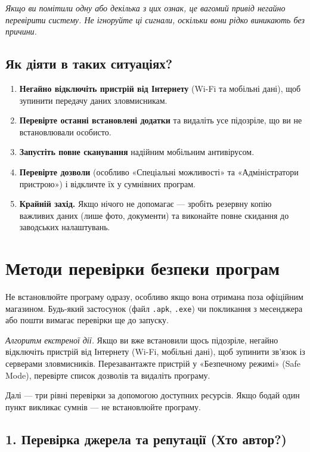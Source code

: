 \textit{Якщо ви помітили одну або декілька з цих ознак, це вагомий привід негайно перевірити систему. Не ігноруйте ці сигнали, оскільки вони рідко виникають без причини.}

\subsection*{Як діяти в таких ситуаціях?}

\begin{enumerate}
    \item \textbf{Негайно відключіть пристрій від Інтернету} (Wi-Fi та мобільні дані), щоб зупинити передачу даних зловмисникам.
    \item \textbf{Перевірте останні встановлені додатки} та видаліть усе підозріле, що ви не встановлювали особисто.
    \item \textbf{Запустіть повне сканування} надійним мобільним антивірусом.
    \item \textbf{Перевірте дозволи} (особливо «Спеціальні можливості» та «Адміністратори пристрою») і відкличте їх у сумнівних програм.
    \item \textbf{Крайній захід.} Якщо нічого не допомагає — зробіть резервну копію важливих даних (лише фото, документи) та виконайте повне скидання до заводських налаштувань.
\end{enumerate}


\section{Методи перевірки безпеки програм}

Не встановлюйте програму одразу, особливо якщо вона отримана поза офіційним магазином. Будь-який застосунок (файл \texttt{.apk}, \texttt{.exe}) чи покликання з месенджера або пошти вимагає перевірки ще до запуску.

\textit{Алгоритм екстреної дії.} Якщо ви вже встановили щось підозріле, негайно відключіть пристрій від Інтернету (Wi-Fi, мобільні дані), щоб зупинити зв'язок із серверами зловмисників. Перезавантажте пристрій у «Безпечному режимі» (Safe Mode), перевірте список дозволів та видаліть програму.

Далі — три рівні перевірки за допомогою доступних ресурсів. Якщо бодай один пункт викликає сумнів — не встановлюйте програму.

\subsection*{1. Перевірка джерела та репутації (Хто автор?)}

